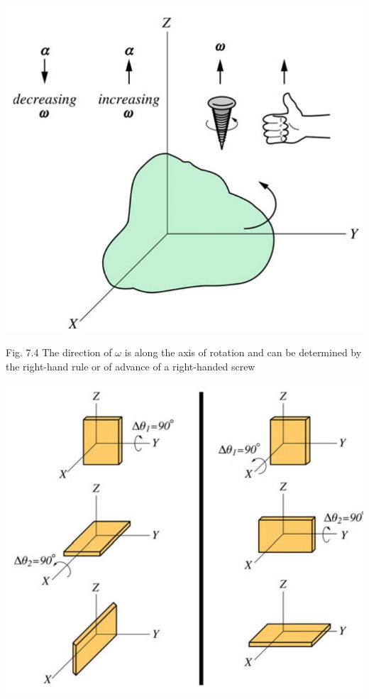 \documentclass[10pt]{article}
\begin{document}
\begin{center}
\includegraphics[max width=\textwidth]{2024_09_13_db1f357d2aad0a03eb2eg-113}
\end{center}

Fig. 7.4 The direction of $\omega$ is along the axis of rotation and can be determined by the right-hand rule or of advance of a right-handed screw

\begin{center}
\includegraphics[max width=\textwidth]{2024_09_13_db1f357d2aad0a03eb2eg-113(1)}
\end{center}
\end{document}
